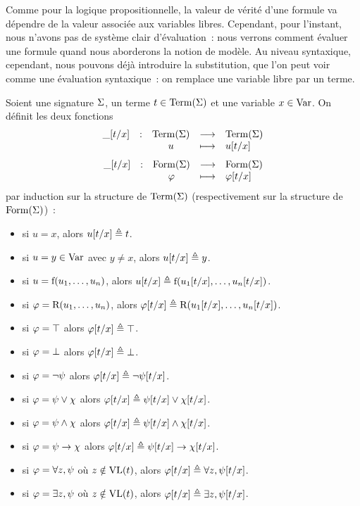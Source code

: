Comme pour la logique propositionnelle, la valeur de vérité d'une formule va
dépendre de la valeur associée aux variables libres. Cependant, pour l'instant,
nous n'avons pas de système clair d'évaluation~: nous verrons comment évaluer
une formule quand nous aborderons la notion de modèle. Au niveau syntaxique,
cependant, nous pouvons déjà introduire la substitution, que l'on peut voir
comme une évaluation syntaxique~: on remplace une variable libre par un terme.

\begin{definition}[Substitution]
  Soient une signature $\Sigma$, un terme $t\in \operatorname{Term}(\Sigma)$ et une variable
  $x\in \operatorname{Var}$. On définit les deux fonctions
  \[
  \makeFun{\tok[t/x]}{\Term(\Sign)}{\Term(\Sign)}{u}{u[t/x]}
  \]
  \[
  \makeFun{\tok[t/x]}{\Formula(\Sign)}{\Formula(\Sign)}{\varFF}{\varFF[t/x]}
  \]
  par induction sur la structure de $\operatorname{Term}(\Sigma)$ (respectivement sur la
  structure de $\operatorname{Form}(\Sigma)$)~:
  \begin{itemize}
  \item si $u = x$, alors $u[t/x] \triangleq t$.
  \item si $u = y\in \operatorname{Var}$ avec $y \neq x$, alors $u[t/x] \triangleq y$.
  \item si $u = \mathrm{f}(u_1,\ldots,u_n)$, alors
    $u[t/x] \triangleq \mathrm{f}(u_1[t/x],\ldots,u_n[t/x])$.
  \item si $\varphi = \mathrm{R}(u_1,\ldots,u_n)$, alors
    $\varphi[t/x] \triangleq \mathrm{R}(u_1[t/x],\ldots,u_n[t/x])$.
  \item si $\varphi = \top$ alors $\varphi[t/x] \triangleq \top$.
  \item si $\varphi = \bot$ alors $\varphi[t/x] \triangleq \bot$.
  \item si $\varphi = \lnot \psi$ alors $\varphi[t/x] \triangleq \lnot \psi[t/x]$.
  \item si $\varphi = \psi \lor \chi$ alors
    $\varphi[t/x] \triangleq \psi[t/x]\lor\chi[t/x]$.
  \item si $\varphi = \psi \land \chi$ alors
    $\varphi[t/x] \triangleq \psi[t/x]\land\chi[t/x]$.
  \item si $\varphi = \psi \to \chi$ alors
    $\varphi[t/x] \triangleq \psi[t/x]\to\chi[t/x]$.
  \item si $\varphi = \forall z, \psi$ où $z\notin \operatorname{VL}(t)$, alors
    $\varphi[t/x] \triangleq \forall z, \psi[t/x]$.
  \item si $\varphi = \exists z, \psi$ où $z\notin \operatorname{VL}(t)$, alors
    $\varphi[t/x] \triangleq \exists z, \psi[t/x]$.
  \end{itemize}
\end{definition}

